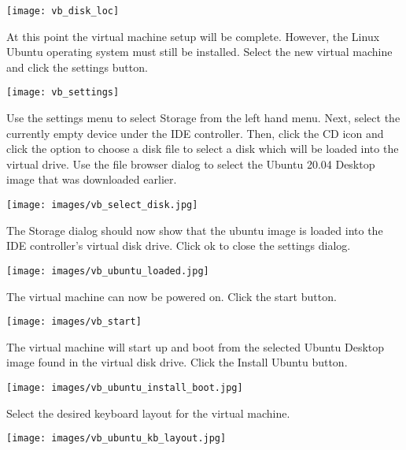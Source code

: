 \documentclass{article}
\begin{document}
\begin{center}
\texttt{[image: vb\_disk\_loc]}
\end{center}

At this point the virtual machine setup will be complete.  However, the Linux Ubuntu operating system must still be installed.  Select the new virtual machine and click the settings button.

\begin{center}
\texttt{[image: vb\_settings]}
\end{center}

Use the settings menu to select Storage from the left hand menu.  Next, select the currently empty device under the IDE controller.  Then, click the CD icon and click the option to choose a disk file to select a disk which will be loaded into the virtual drive.  Use the file browser dialog to select the Ubuntu 20.04 Desktop image that was downloaded earlier.

\begin{center}
\texttt{[image: images/vb\_select\_disk.jpg]}
\end{center}

The Storage dialog should now show that the ubuntu image is loaded into the IDE controller's virtual disk drive.  Click ok to close the settings dialog.

\begin{center}
\texttt{[image: images/vb\_ubuntu\_loaded.jpg]}
\end{center}

The virtual machine can now be powered on.  Click the start button.

\begin{center}
\texttt{[image: images/vb\_start]}
\end{center}

The virtual machine will start up and boot from the selected Ubuntu Desktop image found in the virtual disk drive.  Click the Install Ubuntu button.

\begin{center}
\texttt{[image: images/vb\_ubuntu\_install\_boot.jpg]}
\end{center}

Select the desired keyboard layout for the virtual machine.

\begin{center}
\texttt{[image: images/vb\_ubuntu\_kb\_layout.jpg]}
\end{center}
\end{document}
